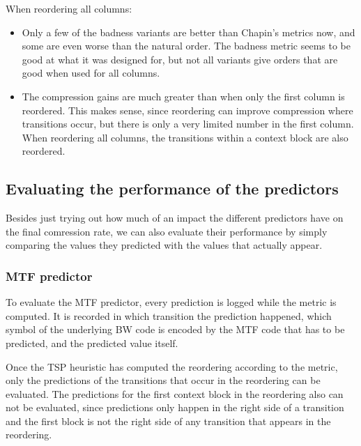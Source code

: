 \documentclass[a4paper]{scrreprt}
\begin{document}
When reordering all columns:
\begin{itemize}
  \item Only a few of the badness variants are better than Chapin's metrics now,
  and some are even worse than the natural order. The badness metric seems to be
  good at what it was designed for, but not all variants give orders that are
  good when used for all columns.
  \item The compression gains are much greater than when only the first column
  is reordered. This makes sense, since reordering can improve compression where
  transitions occur, but there is only a very limited number in the first
  column. When reordering all columns, the transitions within a context block
  are also reordered.
\end{itemize}


\subsection{Evaluating the performance of the predictors}

Besides just trying out how much of an impact the different predictors have on
the final comression rate, we can also evaluate their performance by simply
comparing the values they predicted with the values that actually appear.

\subsubsection{MTF predictor}

To evaluate the MTF predictor, every prediction is logged while the metric is
computed. It is recorded in which transition the prediction happened, which
symbol of the underlying BW code is encoded by the MTF code that has to be
predicted, and the predicted value itself.

Once the TSP heuristic has computed the reordering according to the metric,
only the predictions of the transitions that occur in the reordering can be
evaluated. The predictions for the first context block in the reordering also
can not be evaluated, since predictions only happen in the right side of a
transition and the first block is not the right side of any transition that
appears in the reordering.
\end{document}
